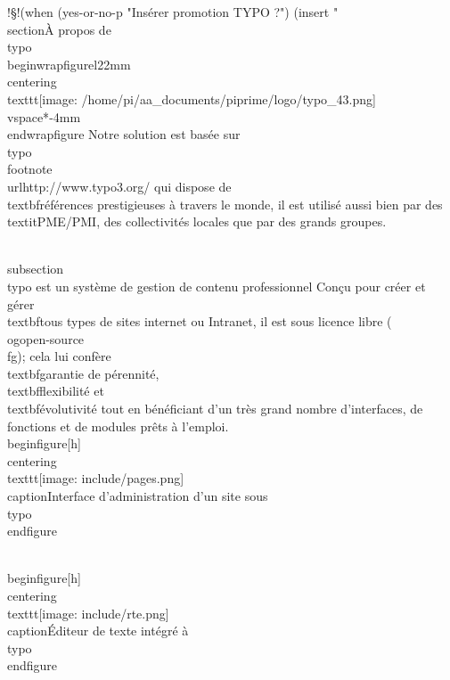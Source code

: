 \documentclass[]{extarticle}
\begin{document}
!§!(when  (yes-or-no-p "Insérer promotion TYPO ?")
(insert "\\section{À propos de \\typo}
\\begin{wrapfigure}{l}{22mm}
  \\centering
  \\texttt{[image: /home/pi/aa\_documents/piprime/logo/typo\_43.png]}
  \\vspace*{-4mm}
\\end{wrapfigure}
Notre solution est basée sur
\\typo\\footnote{\\url{http://www.typo3.org/}} qui dispose de
\\textbf{références prestigieuses} à travers le monde, il est utilisé
aussi bien par des \\textit{PME/PMI}, des collectivités locales que par
des grands groupes.

\\subsection{\\typo est un système de gestion de contenu professionnel}
Conçu pour créer et gérer \\textbf{tous types de sites} internet ou Intranet, il
est sous licence libre (\\og{}open-source\\fg{}); cela lui confère
\\textbf{garantie de pérennité}, \\textbf{flexibilité} et \\textbf{évolutivité} tout en
bénéficiant d'un très grand nombre d'interfaces, de fonctions et de
modules prêts à l'emploi.
\\begin{figure}[h]
  \\centering
  \\texttt{[image: include/pages.png]}
  \\caption{Interface d'administration d'un site sous \\typo}
\\end{figure}

\\begin{figure}[h]
  \\centering
  \\texttt{[image: include/rte.png]}
  \\caption{Éditeur de texte intégré à \\typo}
\\end{figure}
\end{document}
